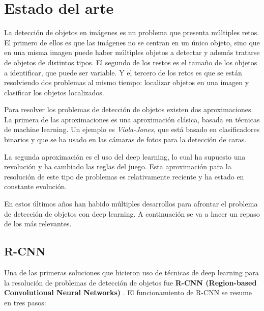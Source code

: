 \section{Estado del arte}
\label{sec:estado_del_arte}

La detección de objetos en imágenes es un problema que presenta múltiples retos. El primero de ellos es que las imágenes no se centran en un único objeto, sino que en una misma imagen puede haber múltiples objetos a detectar y además tratarse de objetos de distintos tipos. El segundo de los restos es el tamaño de los objetos a identificar, que puede ser variable. Y el tercero de los retos es que se están resolviendo dos problemas al mismo tiempo: localizar objetos en una imagen y clasificar los objetos localizados.

Para resolver los problemas de detección de objetos existen dos aproximaciones. La primera de las aproximaciones es una aproximación clásica, basada en técnicas de machine learning. Un ejemplo es \textit{Viola-Jones}, que está basado en clasificadores binarios y que se ha usado en las cámaras de fotos para la detección de caras.

La segunda aproximación es el uso del deep learning, lo cual ha supuesto una revolución y ha cambiado las reglas del juego. Esta aproximación para la resolución de este tipo de problemas es relativamente reciente y ha estado en constante evolución.

En estos últimos años han habido múltiples desarrollos para afrontar el problema de detección de objetos con deep learning. A continuación se va a hacer un repaso de los más relevantes.

\subsection*{R-CNN}

Una de las primeras soluciones que hicieron uso de técnicas de deep learning para la resolución de problemas de detección de objetos fue \textbf{R-CNN (Region-based Convolutional Neural Networks)} \cite{s2_stateofart_rcnn}. El funcionamiento de R-CNN se resume en tres pasos:


